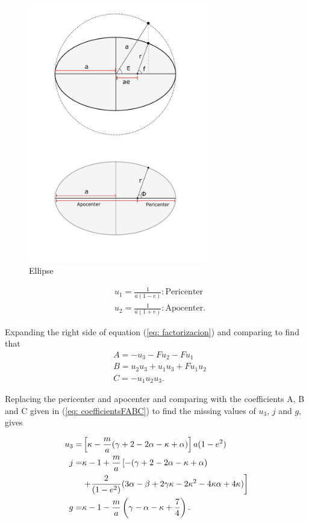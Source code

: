 \begin{figure}[htb!]
\centering
\includegraphics[width=8cm]{../Tesis/Capitulo2/Figures/elipsesencilla.pdf}
\caption{Ellipse}
\label{fig: ellipse}
\end{figure}

\begin{align*}
	&u_1=\frac{1}{a(1-e)}: \text{Pericenter}\\
	&u_2=\frac{1}{a(1+e)}: \text{Apocenter}.
\end{align*}

Expanding the right side of equation (\ref{eq: factorizacion}) and comparing to find that
\begin{subequations}
\begin{align}
	&A = -u_3-Fu_2 -Fu_1\\
	&B = u_2u_3 + u_1u_3 + Fu_1u_2\\
	&C = -u_1u_2u_3.
\end{align}
\end{subequations}

Replacing the pericenter and apocenter and comparing with the coefficients A, B and C given in (\ref{eq: coefficientsFABC}) to find the missing values of $u_3$, $j$ and $g$, gives

\begin{align}
	u_3 = &\left[\kappa - \frac{m}{a}(\gamma+2-2\alpha - \kappa +\alpha)\right]a(1-e^2)\\
	j = &\kappa-1+\frac{m}{a}\left[-(\gamma+2-2\alpha-\kappa+\alpha)\right.\\  \notag
	&\left.+\frac{2}{(1-e^2)}(3\alpha-\beta + 2\gamma\kappa -2\kappa^2 - 4\kappa\alpha + 4\kappa )\right]\\
	g=&\kappa-1-\frac{m}{a}\left(\gamma-\alpha-\kappa+\frac{7}{4}\right).
	\end{align}
	
